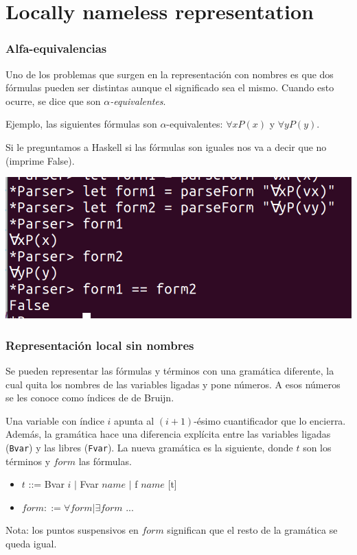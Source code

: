 \documentclass{beamer}
\begin{document}
\section{Locally nameless representation}

\begin{frame}
\frametitle{Alfa-equivalencias}

Uno de los problemas que surgen en la representación con nombres es que dos fórmulas pueden ser distintas aunque el significado sea el mismo. Cuando esto ocurre, se dice que son \textit{$\alpha$-equivalentes}.

Ejemplo, las siguientes fórmulas son $\alpha$-equivalentes: $\forall x P(x)$ y $\forall y P(y)$.

Si le preguntamos a Haskell si las fórmulas son iguales nos va a decir que no (imprime False).

\includegraphics[scale=0.25]{alfa.png}

\end{frame}

\begin{frame}
\frametitle{Representación local sin nombres}

Se pueden representar las fórmulas y términos con una gramática diferente, la cual quita los nombres de las variables ligadas y pone números. A esos números se les conoce como índices de de Bruijn.

Una variable con índice $i$ apunta al $(i+1)$-ésimo cuantificador que lo encierra. Además, la gramática hace una diferencia explícita entre las variables ligadas (\texttt{Bvar}) y las libres (\texttt{Fvar}). La nueva gramática es la siguiente, donde $t$ son los términos y $form$ las fórmulas.

\begin{itemize}
\item $t$ ::= Bvar $i$ $|$ Fvar $name$ $|$ f $name$ [t]
\item $form ::=  \forall form | \exists form$ ...
\end{itemize}

Nota: los puntos suspensivos en $form$ significan que el resto de la gramática se queda igual.

\end{frame}
\end{document}
